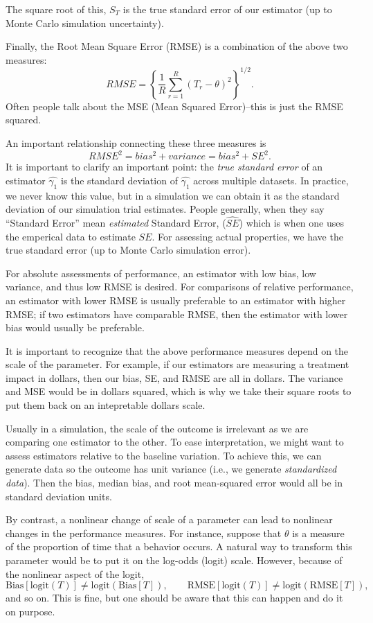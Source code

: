 \documentclass[
]{book}
\begin{document}
The square root of this, \(S_T\) is the true standard error of our estimator (up to Monte Carlo simulation uncertainty).

Finally, the Root Mean Square Error (RMSE) is a combination of the above two measures:
\[ RMSE = \left\{ \frac{1}{R} \sum_{r = 1}^R \left( T_r - \theta\right)^2 \right\}^{1/2}. \]
Often people talk about the MSE (Mean Squared Error)--this is just the RMSE squared.

An important relationship connecting these three measures is
\[ RMSE^2 = bias^2 + variance = bias^2 + SE^2 .\]
It is important to clarify an important point: the \emph{true standard error} of an estimator \(\hat{\gamma_1}\) is the standard deviation of \(\hat{\gamma_1}\) across multiple datasets.
In practice, we never know this value, but in a simulation we can obtain it as the standard deviation of our simulation trial estimates.
People generally, when they say ``Standard Error'' mean \emph{estimated} Standard Error, (\(\widehat{SE}\)) which is when one uses the emperical data to estimate \(SE\).
For assessing actual properties, we have the true standard error (up to Monte Carlo simulation error).

For absolute assessments of performance, an estimator with low bias, low variance, and thus low RMSE is desired.
For comparisons of relative performance, an estimator with lower RMSE is usually preferable to an estimator with higher RMSE; if two estimators have comparable RMSE, then the estimator with lower bias would usually be preferable.

It is important to recognize that the above performance measures depend on the scale of the parameter.
For example, if our estimators are measuring a treatment impact in dollars, then our bias, SE, and RMSE are all in dollars.
The variance and MSE would be in dollars squared, which is why we take their square roots to put them back on an intepretable dollars scale.

Usually in a simulation, the scale of the outcome is irrelevant as we are comparing one estimator to the other.
To ease interpretation, we might want to assess estimators relative to the baseline variation.
To achieve this, we can generate data so the outcome has unit variance (i.e., we generate \emph{standardized data}).
Then the bias, median bias, and root mean-squared error would all be in standard deviation units.

By contrast, a nonlinear change of scale of a parameter can lead to nonlinear changes in the performance measures.
For instance, suppose that \(\theta\) is a measure of the proportion of time that a behavior occurs.
A natural way to transform this parameter would be to put it on the log-odds (logit) scale.
However, because of the nonlinear aspect of the logit,
\[\text{Bias}\left[\text{logit}(T)\right] \neq \text{logit}\left(\text{Bias}[T]\right), \qquad \text{RMSE}\left[\text{logit}(T)\right] \neq \text{logit}\left(\text{RMSE}[T]\right),\]
and so on.
This is fine, but one should be aware that this can happen and do it on purpose.
\end{document}

